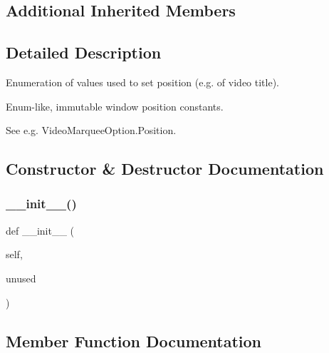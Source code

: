 \subsection*{Additional Inherited Members}


\subsection{Detailed Description}
\begin{DoxyVerb}Enumeration of values used to set position (e.g. of video title).
\end{DoxyVerb}


\begin{DoxyVerb}Enum-like, immutable window position constants.

   See e.g. VideoMarqueeOption.Position.
\end{DoxyVerb}
 

\subsection{Constructor \& Destructor Documentation}
\mbox{\label{classvlc_1_1_position_a2bb95ceade0d4388fafdeabfe906b5fa}} 
\subsubsection{\texorpdfstring{\+\_\+\+\_\+init\+\_\+\+\_\+()}{\_\_init\_\_()}}
{\footnotesize\ttfamily def \+\_\+\+\_\+init\+\_\+\+\_\+ (\begin{DoxyParamCaption}\item[{}]{self,  }\item[{}]{unused }\end{DoxyParamCaption})}



\subsection{Member Function Documentation}
\mbox{\label{classvlc_1_1_position_ac71d81dd3f2d993325779566c783ba0c}} 
